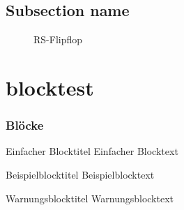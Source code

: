 \subsection{Subsection name}
\begin{frame}
    \begin{figure}[!htb]
      \centering
          \caption{RS-Flipflop}%
          \label{fig:rsflipflop}
        \endminipage\hspace{1cm}   
          \caption{}%
          \label{fig:rsflipfloptakt}
        \endminipage
    \end{figure}
\end{frame}

\section{blocktest}
\begin{frame}
	\frametitle{Blöcke}

    \begin{block}{Einfacher Blocktitel}
        Einfacher Blocktext
    \end{block}
    
    \begin{exampleblock}{Beispielblocktitel}
         Beispielblocktext
    \end{exampleblock}
   
    \begin{alertblock}{Warnungsblocktitel}
         Warnungsblocktext
    \end{alertblock}
    
\end{frame}

